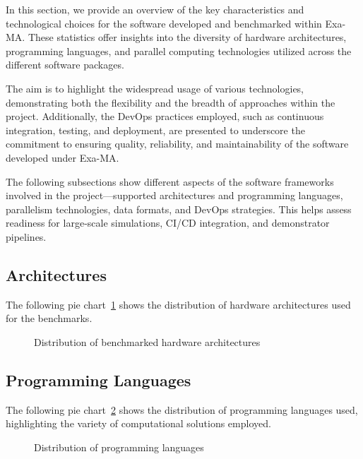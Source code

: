 In this section, we provide an overview of the key characteristics and technological choices for the software developed and benchmarked within Exa-MA. 
These statistics offer insights into the diversity of hardware architectures, programming languages, and parallel computing technologies utilized across the different software packages. 

The aim is to highlight the widespread usage of various technologies, demonstrating both the flexibility and the breadth of approaches within the project. 
Additionally, the DevOps practices employed, such as continuous integration, testing, and deployment, are presented to underscore the commitment to ensuring quality, reliability, and maintainability of the software developed under Exa-MA.

The following subsections show different aspects of the software frameworks involved in the project—supported architectures and programming languages, parallelism technologies, data formats, and DevOps strategies. This helps assess readiness for large‑scale simulations, CI/CD integration, and demonstrator pipelines.


\subsection{Architectures}

The following pie chart~\ref{fig:arch} shows the distribution of hardware architectures used for the benchmarks.

\begin{figure}[H]
\centering
{}
\caption{Distribution of benchmarked hardware architectures}
\label{fig:arch}
\end{figure}


\subsection{Programming Languages}

The following pie chart~\ref{fig:languages} shows the distribution of programming languages used, highlighting the variety of computational solutions employed.

\begin{figure}[H]
\centering
{}
\caption{Distribution of programming languages}
\label{fig:languages}
\end{figure}



